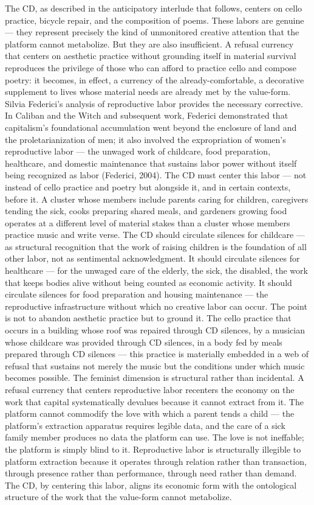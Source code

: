 The CD, as described in the anticipatory interlude that follows, centers on cello practice, bicycle repair, and the composition of poems. These labors are genuine — they represent precisely the kind of unmonitored creative attention that the platform cannot metabolize. But they are also insufficient. A refusal currency that centers on aesthetic practice without grounding itself in material survival reproduces the privilege of those who can afford to practice cello and compose poetry: it becomes, in effect, a currency of the already-comfortable, a decorative supplement to lives whose material needs are already met by the value-form. Silvia Federici’s analysis of reproductive labor provides the necessary corrective. In Caliban and the Witch and subsequent work, Federici demonstrated that capitalism’s foundational accumulation went beyond the enclosure of land and the proletarianization of men; it also involved the expropriation of women’s reproductive labor — the unwaged work of childcare, food preparation, healthcare, and domestic maintenance that sustains labor power without itself being recognized as labor (Federici, 2004). The CD must center this labor — not instead of cello practice and poetry but alongside it, and in certain contexts, before it. A cluster whose members include parents caring for children, caregivers tending the sick, cooks preparing shared meals, and gardeners growing food operates at a different level of material stakes than a cluster whose members practice music and write verse. The CD should circulate silences for childcare — as structural recognition that the work of raising children is the foundation of all other labor, not as sentimental acknowledgment. It should circulate silences for healthcare — for the unwaged care of the elderly, the sick, the disabled, the work that keeps bodies alive without being counted as economic activity. It should circulate silences for food preparation and housing maintenance — the reproductive infrastructure without which no creative labor can occur. The point is not to abandon aesthetic practice but to ground it. The cello practice that occurs in a building whose roof was repaired through CD silences, by a musician whose childcare was provided through CD silences, in a body fed by meals prepared through CD silences — this practice is materially embedded in a web of refusal that sustains not merely the music but the conditions under which music becomes possible. The feminist dimension is structural rather than incidental. A refusal currency that centers reproductive labor recenters the economy on the work that capital systematically devalues because it cannot extract from it. The platform cannot commodify the love with which a parent tends a child — the platform’s extraction apparatus requires legible data, and the care of a sick family member produces no data the platform can use. The love is not ineffable; the platform is simply blind to it. Reproductive labor is structurally illegible to platform extraction because it operates through relation rather than transaction, through presence rather than performance, through need rather than demand. The CD, by centering this labor, aligns its economic form with the ontological structure of the work that the value-form cannot metabolize.

